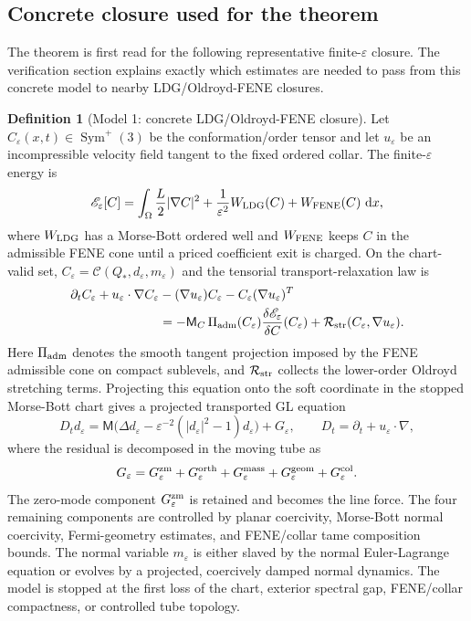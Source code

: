\documentclass[11pt]{article}
\theoremstyle{definition}
\newtheorem{definition}[theorem]{Definition}
\newcommand{\dd}{\,\mathrm d}
\newcommand{\eps}{\varepsilon}
\newcommand{\Mmob}{\mathsf M}
\begin{document}
\subsection{Concrete closure used for the theorem}
\label{subsec:concrete-model}

The theorem is first read for the following representative finite-\(\eps\)
closure.  The verification section explains exactly which estimates are needed
to pass from this concrete model to nearby LDG/Oldroyd-FENE closures.

\begin{definition}[Model 1: concrete LDG/Oldroyd-FENE closure]
\label{model:concrete-closure}
Let \(C_\eps(x,t)\in\operatorname{Sym}^+(3)\) be the conformation/order tensor
and let \(u_\eps\) be an incompressible velocity field tangent to the fixed
ordered collar.  The finite-\(\eps\) energy is
\[
        \mathscr E_\eps[C]
        =
        \int_\Omega
        \frac{L}{2}|\nabla C|^2
        +\frac{1}{\eps^2}W_{\rm LDG}(C)
        +W_{\rm FENE}(C)
        \,\dd x,
\]
where \(W_{\rm LDG}\) has a Morse-Bott ordered well and \(W_{\rm FENE}\)
keeps \(C\) in the admissible FENE cone until a priced coefficient exit is
charged.  On the chart-valid set, \(C_\eps=\mathcal C(Q_\ast,d_\eps,m_\eps)\)
and the tensorial transport-relaxation law is
\[
\begin{aligned}
        \partial_t C_\eps+u_\eps\cdot\nabla C_\eps
        &-(\nabla u_\eps)C_\eps
        -C_\eps(\nabla u_\eps)^T \\
        &=
        -\mathsf M_C\,\Pi_{\rm adm}(C_\eps)
        \frac{\delta \mathscr E_\eps}{\delta C}(C_\eps)
        +\mathcal R_{\rm str}(C_\eps,\nabla u_\eps).
\end{aligned}
\]
Here \(\Pi_{\rm adm}\) denotes the smooth tangent projection imposed by the
FENE admissible cone on compact sublevels, and \(\mathcal R_{\rm str}\)
collects the lower-order Oldroyd stretching terms.  Projecting this equation
onto the soft coordinate in the stopped Morse-Bott chart gives a projected
transported GL equation
\[
        D_t d_\eps
        =
        \Mmob\bigl(\Delta d_\eps
        -\eps^{-2}(|d_\eps|^2-1)d_\eps\bigr)
        +G_\eps,
        \qquad D_t=\partial_t+u_\eps\cdot\nabla,
\]
where the residual is decomposed in the moving tube as
\[
        G_\eps
        =G_\eps^{\rm zm}+G_\eps^{\rm orth}
        +G_\eps^{\rm mass}+G_\eps^{\rm geom}+G_\eps^{\rm col}.
\]
The zero-mode component \(G_\eps^{\rm zm}\) is retained and becomes the line
force.  The four remaining components are controlled by planar coercivity,
Morse-Bott normal coercivity, Fermi-geometry estimates, and FENE/collar tame
composition bounds.  The normal variable \(m_\eps\) is either slaved by the
normal Euler-Lagrange equation or evolves by a projected, coercively damped
normal dynamics.  The model is stopped at the first loss of the chart, exterior
spectral gap, FENE/collar compactness, or controlled tube topology.
\end{definition}
\end{document}
